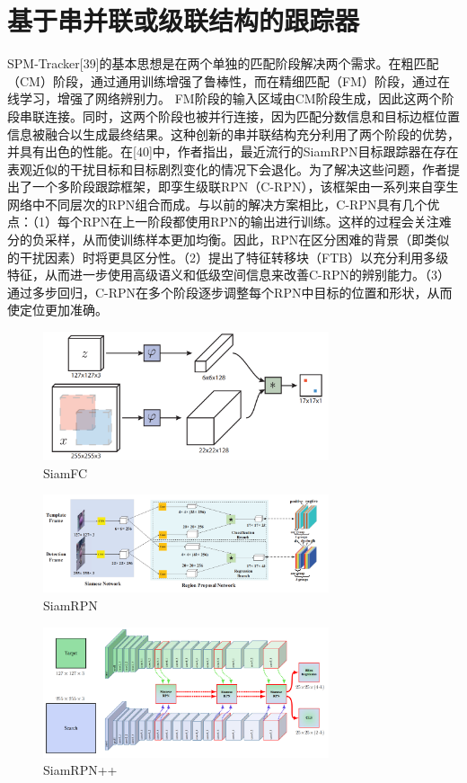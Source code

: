 \section{基于串并联或级联结构的跟踪器}
SPM-Tracker[39]的基本思想是在两个单独的匹配阶段解决两个需求。在粗匹配（CM）阶段，通过通用训练增强了鲁棒性，而在精细匹配（FM）阶段，通过在线学习，增强了网络辨别力。 FM阶段的输入区域由CM阶段生成，因此这两个阶段串联连接。同时，这两个阶段也被并行连接，因为匹配分数信息和目标边框位置信息被融合以生成最终结果。这种创新的串并联结构充分利用了两个阶段的优势，并具有出色的性能。在[40]中，作者指出，最近流行的SiamRPN目标跟踪器在存在表观近似的干扰目标和目标剧烈变化的情况下会退化。为了解决这些问题，作者提出了一个多阶段跟踪框架，即孪生级联RPN（C-RPN），该框架由一系列来自孪生网络中不同层次的RPN组合而成。与以前的解决方案相比，C-RPN具有几个优点：（1）每个RPN在上一阶段都使用RPN的输出进行训练。这样的过程会关注难分的负采样，从而使训练样本更加均衡。因此，RPN在区分困难的背景（即类似的干扰因素）时将更具区分性。（2）提出了特征转移块（FTB）以充分利用多级特征，从而进一步使用高级语义和低级空间信息来改善C-RPN的辨别能力。（3）通过多步回归，C-RPN在多个阶段逐步调整每个RPN中目标的位置和形状，从而使定位更加准确。
\begin{figure}
\centering
\includegraphics[width=0.75\textwidth]{Img/related/SiamFC.png}
\caption{SiamFC}
\end{figure}

\begin{figure}
\centering
\includegraphics[width=0.75\textwidth]{Img/related/SiamRPN.png}
\caption{SiamRPN}
\end{figure}

\begin{figure}
\centering
\includegraphics[width=0.75\textwidth]{Img/related/SiamRPN++.png}
\caption{SiamRPN++}
\end{figure}

